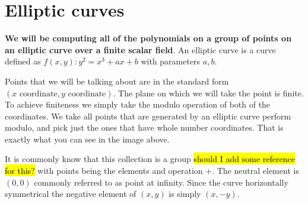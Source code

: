 \section{Elliptic curves}
\textbf{We will be computing all of the polynomials on a group of points on an elliptic curve over a finite scalar field}. An elliptic curve is a curve defined as $f(x,y): y^2 = x^3 + ax + b$ with parameters $a, b$.

Points that we will be talking about are in the standard form $(x \text{ coordinate}, y \text{ coordinate})$. The plane on which we will take the point is finite. To achieve finiteness we simply take the modulo operation of both of the coordinates. We take all points that are generated by an elliptic curve perform modulo, and pick just the ones that have whole number coordinates. That is exactly what you can see in the image above.

It is commonly know that this collection is a group \hl{should I add some reference for this?} with points being the elements and operation $+$. The neutral element is $(0,0)$ commonly referred to as point at infinity. Since the curve horizontally symmetrical the negative element of $(x, y)$ is simply $(x,-y)$.




